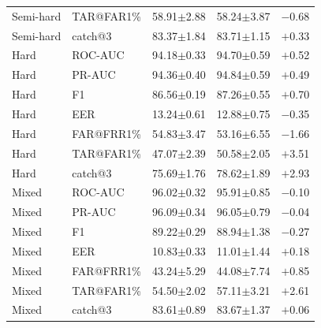 \documentclass[11pt]{article}
\begin{document}
\begin{table}[!t]
\begin{minipage}[t]{0.48\textwidth}
\begin{tabular}{l l c c c}
Semi-hard & TAR@FAR1\% & 58.91$\pm$2.88 & 58.24$\pm$3.87 & $-$0.68 \\
Semi-hard & catch@3    & 83.37$\pm$1.84 & 83.71$\pm$1.15 & $+$0.33 \\
\midrule
Hard      & ROC-AUC    & 94.18$\pm$0.33 & 94.70$\pm$0.59 & $+$0.52 \\
Hard      & PR-AUC     & 94.36$\pm$0.40 & 94.84$\pm$0.59 & $+$0.49 \\
Hard      & F1         & 86.56$\pm$0.19 & 87.26$\pm$0.55 & $+$0.70 \\
Hard      & EER        & 13.24$\pm$0.61 & 12.88$\pm$0.75 & $-$0.35 \\
Hard      & FAR@FRR1\% & 54.83$\pm$3.47 & 53.16$\pm$6.55 & $-$1.66 \\
Hard      & TAR@FAR1\% & 47.07$\pm$2.39 & 50.58$\pm$2.05 & $+$3.51 \\
Hard      & catch@3    & 75.69$\pm$1.76 & 78.62$\pm$1.89 & $+$2.93 \\
\midrule
Mixed     & ROC-AUC    & 96.02$\pm$0.32 & 95.91$\pm$0.85 & $-$0.10 \\
Mixed     & PR-AUC     & 96.09$\pm$0.34 & 96.05$\pm$0.79 & $-$0.04 \\
Mixed     & F1         & 89.22$\pm$0.29 & 88.94$\pm$1.38 & $-$0.27 \\
Mixed     & EER        & 10.83$\pm$0.33 & 11.01$\pm$1.44 & $+$0.18 \\
Mixed     & FAR@FRR1\% & 43.24$\pm$5.29 & 44.08$\pm$7.74 & $+$0.85 \\
Mixed     & TAR@FAR1\% & 54.50$\pm$2.02 & 57.11$\pm$3.21 & $+$2.61 \\
Mixed     & catch@3    & 83.61$\pm$0.89 & 83.67$\pm$1.37 & $+$0.06 \\
\bottomrule
\end{tabular}
\label{tab:app_pan_electra}
\end{minipage}
\end{table}
\end{document}
